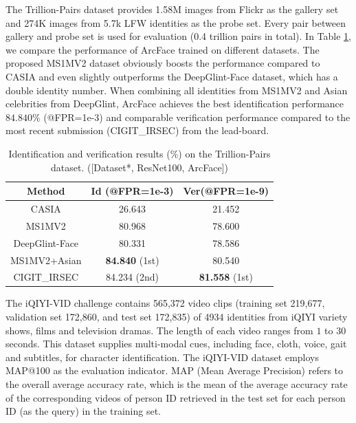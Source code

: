 \documentclass[10pt,twocolumn,letterpaper]{article}
\begin{document}
 The Trillion-Pairs dataset \cite{glintweb} provides 1.58M images from Flickr as the gallery set and 274K images from 5.7k LFW \cite{huang2007labeled} identities as the probe set. Every pair between gallery and probe set is used for evaluation (0.4 trillion pairs in total). In Table \ref{table:trillionpairs}, we compare the performance of ArcFace trained on different datasets. The proposed MS1MV2 dataset obviously boosts the performance compared to CASIA and even slightly outperforms the DeepGlint-Face dataset, which has a double identity number. When combining all identities from MS1MV2 and Asian celebrities from DeepGlint, ArcFace achieves the best identification performance $84.840\%$ (@FPR=1e-3) and comparable verification performance compared to the most recent submission (CIGIT\_IRSEC) from the lead-board.  

\begin{table}[t!]
\begin{center}
\begin{tabular}{c|c|c}
\hline
Method      & Id (@FPR=1e-3)    & Ver(@FPR=1e-9) \\
\hline
CASIA        & 26.643      & 21.452\\
MS1MV2       & 80.968      & 78.600\\
DeepGlint-Face    & 80.331      & 78.586\\
MS1MV2+Asian  & {\bf 84.840} (1st)  & 80.540\\
\hline
CIGIT\_IRSEC   & 84.234 (2nd) & {\bf 81.558} (1st) \\
\hline
\end{tabular}
\end{center}
\vspace{-2mm}
\caption{Identification and verification results ($\%$) on the Trillion-Pairs dataset. ([Dataset*, ResNet100, ArcFace])}
\label{table:trillionpairs}
\vspace{-2mm}
\end{table}

 The iQIYI-VID challenge \cite{IQIYI2018} contains 565,372 video clips (training set 219,677, validation set 172,860, and test set 172,835) of 4934 identities from iQIYI variety shows, films and television dramas. The length of each video ranges from $1$ to $30$ seconds. This dataset supplies multi-modal cues, including face, cloth, voice, gait and subtitles, for character identification. The iQIYI-VID dataset employs MAP@100 as the evaluation indicator. MAP (Mean Average Precision) refers to the overall average accuracy rate, which is the mean of the average accuracy rate of the corresponding videos of person ID retrieved in the test set for each person ID (as the query) in the training set.
\end{document}
